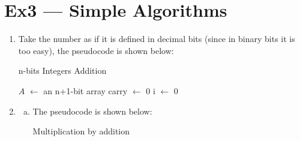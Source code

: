 \documentclass[12pt, a4paper]{article}
\begin{document}
\section*{Ex3 --- Simple Algorithms}
\begin{enumerate}
    \item Take the number as if it is defined in decimal bits (since in binary bits it is too easy), 
          the pseudocode is shown below:
          \begin{algorithm}[h!]
              \caption{n-bits Integers Addition}
              $A$ $\leftarrow$ an n+1-bit array\;
              carry $\leftarrow$ 0\;
              i $\leftarrow$ 0\;
              
              \;

          \end{algorithm}
    
    \item \begin{enumerate}[a)]
        \item The pseudocode is shown below:
              \begin{algorithm}[]
                  \caption{Multiplication by addition}

                  

\end{algorithm}
\end{enumerate}
\end{enumerate}
\end{document}
